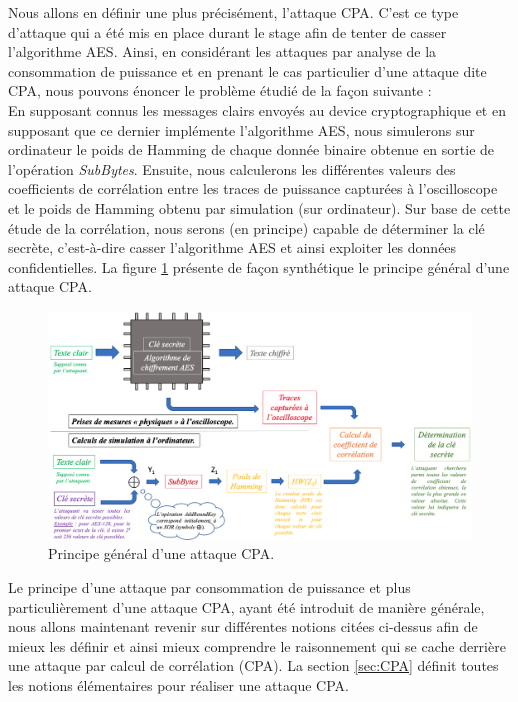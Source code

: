 \documentclass[oneside]{book}
\begin{document}
\hspace{-0.5 cm}Nous allons en définir une plus précisément, l'attaque CPA. C'est ce type d'attaque qui a été mis en place durant le stage afin de tenter de casser l'algorithme AES. Ainsi, en considérant les attaques par analyse de la consommation de puissance et en prenant le cas particulier d'une attaque dite CPA, nous pouvons énoncer le problème étudié de la façon suivante : \\ En supposant connus les messages clairs envoyés au device cryptographique et en supposant que ce dernier implémente l'algorithme AES, nous simulerons sur ordinateur le poids de Hamming de chaque donnée binaire obtenue en sortie de l'opération \textit{SubBytes}. Ensuite, nous calculerons les différentes valeurs des coefficients de corrélation entre les traces de puissance capturées à l'oscilloscope et le poids de Hamming obtenu par simulation (sur ordinateur). Sur base de cette étude de la corrélation, nous serons (en principe) capable de déterminer la clé secrète, c'est-à-dire casser l'algorithme AES et ainsi exploiter les données confidentielles. La figure \ref{fig:CPA} présente de façon synthétique le principe général d'une attaque CPA.
\begin{figure}[h]
    \hspace{-1.5 cm}
    \includegraphics[scale=0.34]{image/CPA}
    \caption{Principe général d'une attaque CPA.}
    \label{fig:CPA} 
\end{figure}

\vspace{-0.3 cm}Le principe d'une attaque par consommation de puissance et plus particulièrement d'une attaque CPA, ayant été introduit de manière générale, nous allons maintenant revenir sur différentes notions citées ci-dessus afin de mieux les définir et ainsi mieux comprendre le raisonnement qui se cache derrière une attaque par calcul de corrélation (CPA). La section \ref{sec:CPA} définit toutes les notions élémentaires pour réaliser une attaque CPA.
\end{document}

